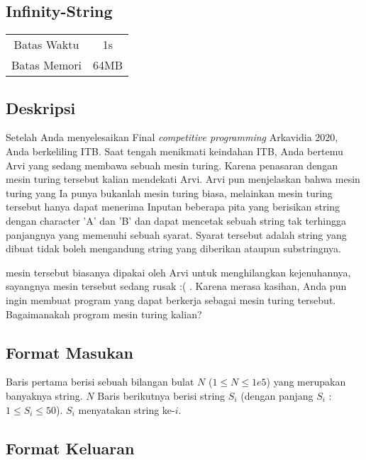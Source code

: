 \documentclass{article}
\begin{document}
\begin{center}
    \section*{Infinity-String} %

    \begin{tabular}{ | c c | }
        \hline
        Batas Waktu  & 1s \\    %
        Batas Memori & 64MB \\  %
        \hline
    \end{tabular}
\end{center}

\subsection*{Deskripsi}

Setelah Anda menyelesaikan Final \textit{competitive programming} Arkavidia 2020, Anda berkeliling ITB. Saat tengah menikmati keindahan ITB, Anda bertemu
Arvi yang sedang membawa sebuah mesin turing. Karena penasaran dengan mesin turing tersebut kalian mendekati Arvi. Arvi pun menjelaskan bahwa mesin turing
yang Ia punya bukanlah mesin turing biasa, melainkan mesin turing tersebut hanya dapat menerima Inputan beberapa pita yang berisikan string dengan 
character 'A' dan 'B' dan dapat mencetak sebuah string tak terhingga panjangnya yang memenuhi sebuah syarat. Syarat tersebut adalah string yang dibuat tidak boleh
mengandung string yang diberikan ataupun substringnya.

mesin tersebut biasanya dipakai oleh Arvi untuk menghilangkan kejenuhannya, sayangnya mesin tersebut sedang rusak :( . Karena merasa kasihan, Anda pun
ingin membuat program yang dapat berkerja sebagai mesin turing tersebut. Bagaimanakah program mesin turing kalian?  

\subsection*{Format Masukan}

Baris pertama berisi sebuah bilangan bulat $N$ ($1 \leq N \leq 1e5$) yang merupakan banyaknya string.
$N$ Baris berikutnya berisi string $S_i$ (dengan panjang $S_i$ : $1 \leq S_i \leq 50$). $S_i$ menyatakan string ke-$i$.

\subsection*{Format Keluaran}
\end{document}
